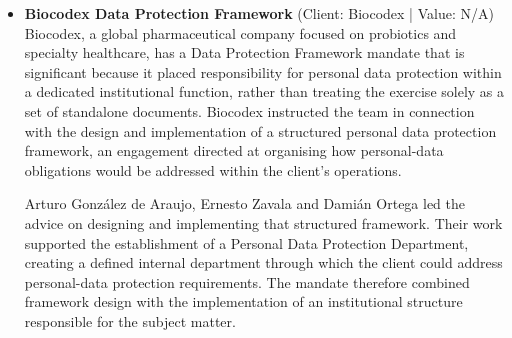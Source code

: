 \documentclass[11pt]{article}
\begin{document}
\begin{itemize}
MEGA DIRECT, S.A. de C.V. instructed the firm on complex data protection and database-related matters. The work has included representing the client in legal proceedings concerning the acquisition, processing, storage and protection of data. Each of these stages is expressly material to the mandate: data acquisition, processing, storage and protection form the factual and legal focus of the proceedings in which the team has acted for MEGA DIRECT, S.A. de C.V.

Arturo González de Araujo, Ernesto Zavala and Damián Ortega lead the representation. Their involvement places the matter in a contentious setting, rather than limiting the engagement to documentation or internal policy work, and requires the team to address the legal issues arising from the client’s databases while preserving the continuity of its business activities. The concrete outcome identified by the submission is the maintenance of business continuity for MEGA DIRECT, S.A. de C.V. while the firm represents it in proceedings involving regulated data acquisition, processing, storage and protection.
\item \textbf{Biocodex Data Protection Framework} (Client: Biocodex | Value: N/A)\\ Biocodex, a global pharmaceutical company focused on probiotics and specialty healthcare, has a Data Protection Framework mandate that is significant because it placed responsibility for personal data protection within a dedicated institutional function, rather than treating the exercise solely as a set of standalone documents. Biocodex instructed the team in connection with the design and implementation of a structured personal data protection framework, an engagement directed at organising how personal-data obligations would be addressed within the client’s operations.

Arturo González de Araujo, Ernesto Zavala and Damián Ortega led the advice on designing and implementing that structured framework. Their work supported the establishment of a Personal Data Protection Department, creating a defined internal department through which the client could address personal-data protection requirements. The mandate therefore combined framework design with the implementation of an institutional structure responsible for the subject matter.


\end{itemize}
\end{document}
